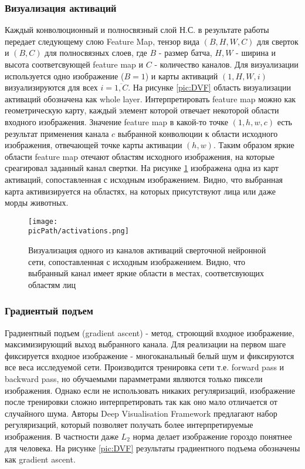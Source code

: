\documentclass[oneside,final,14pt]{extreport}
\newcommand{\picPath}{img}
\begin{document}
\subsubsection{Визуализация активаций}
Каждый конволюционный и полносвязный слой Н.С. в результате работы передает следующему слою Feature Map, тензор вида $(B,H,W,C)$ для сверток и $(B,C)$ для полносвязных слоев, где $B $  - размер батча, $H, W$ - ширина и высота соответсвующей feature map и  $C$ - количество каналов. Для визуализации используется одно изображение ($B=1$) и карты активаций $(1,H,W,i)$ визуализируются для всех $i = \overline{1,C}$. На рисунке \ref{pic:DVF} область визуализации активаций обозначена как whole layer. Интерпретировать feature map можно как геометрическую карту, каждый элемент которой отвечает некоторой области входного изображения. Значение feature map в какой-то точке $(1,h,w,c)$  есть результат применения канала $c$ выбранной конволюции к области исходного изображения, отвечающей точке карты активации $(h,w)$. Таким образом яркие области feature map отечают областям исходного изображения, на которые среагировал заданный канал свертки. На рисунке \ref{pic:activations} изображена одна из карт активаций, сопоставленная с исходным изображением. Видно, что выбранная карта активизируется на областях, на которых присутствуют лица или даже морды животных.
\begin{figure}[H]
\begin{center}
\texttt{[image: \\picPath/activations.png]}
\end{center}
  \caption{Визуализация одного из каналов активаций сверточной нейронной сети, сопоставленная с исходным изображением. Видно, что выбранный канал имеет яркие области в местах, соответсвующих областям лиц}
  \label{pic:activations}
\end{figure}
\subsubsection{Градиентый подъем}
Градиентный подъем (gradient ascent) - метод, строющий входное изображение, максимизирующий выход выбранного канала. Для реализации на первом шаге фиксируется входное изображение - многоканальный белый шум и фиксируются все веса исследуемой сети. Производится тренировка сети т.е. forward pass и backward pass, но обучаемыми парамметрами являются только пиксели изображения. Однако если не использовать никаких регуляризаций, изображение после тренировки сложно интерпретировать так как оно мало отличается от случайного шума. Авторы Deep Visualisation Framework предлагают набор регуляризаций, который позволяет получать более интерпретируемые изображения. В частности даже $L_2$ норма делает изображение гороздо понятнее для человека. На рисунке \ref{pic:DVF} результаты градиентного подъема обозначены как gradient ascent.
\end{document}
